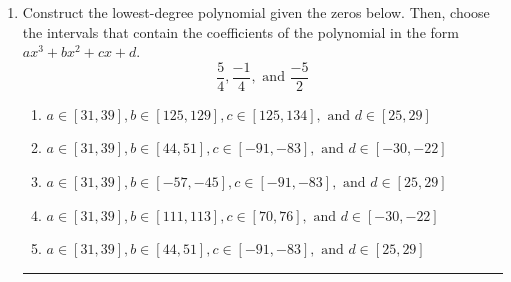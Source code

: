 \documentclass[14pt]{extbook}
\newcommand{\litem}[1]{\item#1\hspace*{-1cm}\rule{\textwidth}{0.4pt}}
\begin{document}
\begin{enumerate}
\litem{
Construct the lowest-degree polynomial given the zeros below. Then, choose the intervals that contain the coefficients of the polynomial in the form $ax^3+bx^2+cx+d$.\[ \frac{5}{4}, \frac{-1}{4}, \text{ and } \frac{-5}{2} \]\begin{enumerate}[label=\Alph*.]
\item \( a \in [31, 39], b \in [125, 129], c \in [125, 134], \text{ and } d \in [25, 29] \)
\item \( a \in [31, 39], b \in [44, 51], c \in [-91, -83], \text{ and } d \in [-30, -22] \)
\item \( a \in [31, 39], b \in [-57, -45], c \in [-91, -83], \text{ and } d \in [25, 29] \)
\item \( a \in [31, 39], b \in [111, 113], c \in [70, 76], \text{ and } d \in [-30, -22] \)
\item \( a \in [31, 39], b \in [44, 51], c \in [-91, -83], \text{ and } d \in [25, 29] \)


\end{enumerate}}
\end{enumerate}
\end{document}

